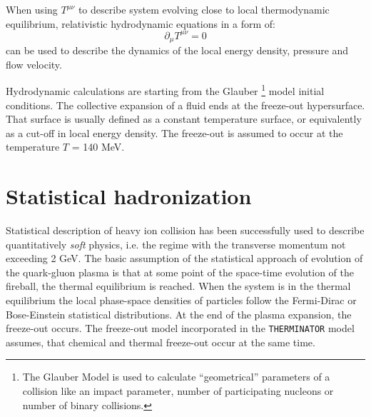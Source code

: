   When using $T^{\mu\nu}$ to describe system evolving close to local thermodynamic equilibrium, relativistic hydrodynamic equations in a form of:
  \begin{equation}
    \partial_{\mu} T^{\mu\nu} = 0
  \end{equation}
  can be used to describe the dynamics of the local energy density, pressure and flow velocity.

  Hydrodynamic calculations are starting from the Glauber \footnote{The Glauber Model is used to calculate ``geometrical'' parameters of a collision like an impact parameter, number of participating nucleons or number of binary collisions.}
  model initial conditions.
  The collective expansion of a fluid ends at the freeze-out hypersurface.
  That surface is usually defined as a constant temperature surface, or equivalently as a cut-off in local energy density.
  The freeze-out is assumed to occur at the temperature $T$ = 140 MeV.

  \section{Statistical hadronization}
    Statistical description of heavy ion collision has been successfully used to describe quantitatively \textit{soft} physics, i.e. the regime with the transverse momentum not exceeding 2 GeV.
    The basic assumption of the statistical approach of evolution of the quark-gluon plasma is that at some point of the space-time evolution of the fireball, the thermal equilibrium is reached.
    When the system is in the thermal equilibrium the local phase-space densities of particles follow the Fermi-Dirac or Bose-Einstein statistical distributions.
    At the end of the plasma expansion, the freeze-out occurs.
    The freeze-out model incorporated in the \verb|THERMINATOR| model assumes, that chemical and thermal freeze-out occur at the same time.
